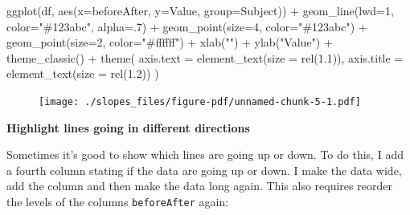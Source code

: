 \documentclass[
  letterpaper,
  DIV=11,
  numbers=noendperiod]{scrreprt}
\newenvironment{Shaded}{\begin{snugshade}}{\end{snugshade}}
\newcommand{\AttributeTok}[1]{\textcolor[rgb]{0.40,0.45,0.13}{#1}}
\newcommand{\DecValTok}[1]{\textcolor[rgb]{0.68,0.00,0.00}{#1}}
\newcommand{\FloatTok}[1]{\textcolor[rgb]{0.68,0.00,0.00}{#1}}
\newcommand{\FunctionTok}[1]{\textcolor[rgb]{0.28,0.35,0.67}{#1}}
\newcommand{\NormalTok}[1]{\textcolor[rgb]{0.00,0.23,0.31}{#1}}
\newcommand{\SpecialCharTok}[1]{\textcolor[rgb]{0.37,0.37,0.37}{#1}}
\newcommand{\StringTok}[1]{\textcolor[rgb]{0.13,0.47,0.30}{#1}}
\begin{document}
\begin{Shaded}
\begin{Highlighting}[]
\FunctionTok{ggplot}\NormalTok{(df, }\FunctionTok{aes}\NormalTok{(}\AttributeTok{x=}\NormalTok{beforeAfter, }\AttributeTok{y=}\NormalTok{Value, }\AttributeTok{group=}\NormalTok{Subject)) }\SpecialCharTok{+}
  \FunctionTok{geom\_line}\NormalTok{(}\AttributeTok{lwd=}\DecValTok{1}\NormalTok{, }\AttributeTok{color=}\StringTok{"\#123abc"}\NormalTok{, }\AttributeTok{alpha=}\NormalTok{.}\DecValTok{7}\NormalTok{) }\SpecialCharTok{+}
  \FunctionTok{geom\_point}\NormalTok{(}\AttributeTok{size=}\DecValTok{4}\NormalTok{, }\AttributeTok{color=}\StringTok{"\#123abc"}\NormalTok{) }\SpecialCharTok{+}
  \FunctionTok{geom\_point}\NormalTok{(}\AttributeTok{size=}\DecValTok{2}\NormalTok{, }\AttributeTok{color=}\StringTok{"\#ffffff"}\NormalTok{) }\SpecialCharTok{+}
  \FunctionTok{xlab}\NormalTok{(}\StringTok{""}\NormalTok{) }\SpecialCharTok{+}
  \FunctionTok{ylab}\NormalTok{(}\StringTok{"Value"}\NormalTok{) }\SpecialCharTok{+}
  \FunctionTok{theme\_classic}\NormalTok{() }\SpecialCharTok{+}
  \FunctionTok{theme}\NormalTok{(}
    \AttributeTok{axis.text =} \FunctionTok{element\_text}\NormalTok{(}\AttributeTok{size =} \FunctionTok{rel}\NormalTok{(}\FloatTok{1.1}\NormalTok{)),}
    \AttributeTok{axis.title =} \FunctionTok{element\_text}\NormalTok{(}\AttributeTok{size =} \FunctionTok{rel}\NormalTok{(}\FloatTok{1.2}\NormalTok{))}
\NormalTok{  ) }
\end{Highlighting}
\end{Shaded}

\begin{figure}[H]

{\centering \texttt{[image: ./slopes\_files/figure-pdf/unnamed-chunk-5-1.pdf]}

}

\end{figure}

\textbf{Highlight lines going in different directions}

Sometimes it's good to show which lines are going up or down. To do
this, I add a fourth column stating if the data are going up or down. I
make the data wide, add the column and then make the data long again.
This also requires reorder the levels of the columns
\texttt{beforeAfter} again:
\end{document}
